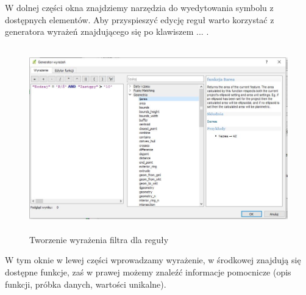 \documentclass[12pt,a4paper]{book}
\begin{document}
W dolnej części okna znajdziemy narzędzia do wyedytowania symbolu z dostępnych elementów. Aby przyspieszyć edycję reguł warto korzystać z generatora wyrażeń znajdującego się po klawiszem  ... .
\begin{figure}[!ht]
	\centering
\includegraphics[height=8cm]{007-filtr-reguly.jpg}
\caption{Tworzenie wyrażenia filtra dla reguły}
\end{figure}
W tym oknie w lewej części wprowadzamy wyrażenie, w środkowej znajdują się dostępne funkcje, zaś w prawej możemy znaleźć informacje pomocnicze (opis funkcji, próbka danych, wartości unikalne).
\end{document}
